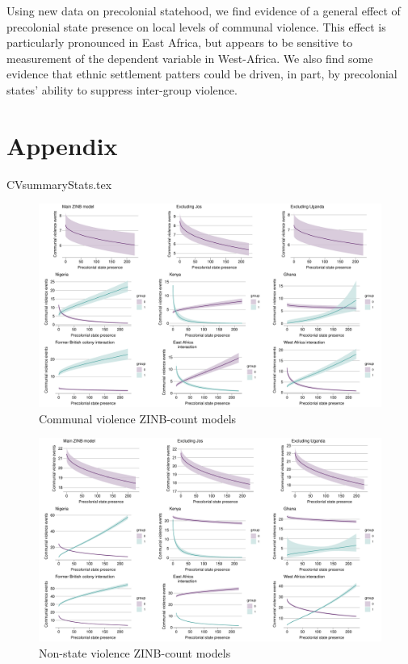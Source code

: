 Using new data on precolonial statehood, we find evidence of a general effect of
precolonial state presence on local levels of communal violence. This effect is
particularly pronounced in East Africa, but appears to be sensitive to
measurement of the dependent variable in West-Africa. We also find some evidence
that ethnic settlement patters could be driven, in part, by precolonial states'
ability to suppress inter-group violence. 


\clearpage




\clearpage

\section{Appendix} \label{Appendix}

{CVsummaryStats.tex}

\begin{figure}
	\centering
	\includegraphics[width=1\linewidth]{R/Output/org3plots.pdf}
	\caption{Communal violence ZINB-count models}
	\label{org3plots}
\end{figure}

\begin{figure}
	\centering
	\includegraphics[width=1\linewidth]{R/Output/nonstateplots.pdf}
	\caption{Non-state violence ZINB-count models}
	\label{non-stateplots}
\end{figure}

